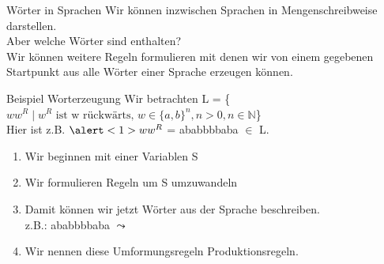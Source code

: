 %
%
%
%

\begin{frame}[fragile]{Wörter in Sprachen}
Wir können inzwischen Sprachen in Mengenschreibweise darstellen.\\Aber welche Wörter sind enthalten?\\
\vspace{0.3cm}
Wir können weitere Regeln formulieren mit denen wir von einem gegebenen Startpunkt aus alle Wörter einer Sprache erzeugen können.
\end{frame}

\begin{frame}[fragile]{Beispiel Worterzeugung}
    \small{Wir betrachten L = \{$ww^R \mid w^R\text{ ist w rückwärts, }w \in \{a, b\}^n, n>0, n\in \mathbb{N}$\}\\
    Hier ist z.B. $\alert<1>{w}w^R$ = \alert<1>{ababb}bbaba $\in$ L.}\\
    \begin{enumerate}
    \item <2-> 
            \alert<2,5>{Wir beginnen mit einer Variablen S}
    \item <3-> 
            \alert<3>{Wir formulieren Regeln um S umzuwandeln}
            \alert<4>{}\vspace{-0.3in}
    \item <5->
            \alert<5>{Damit können wir jetzt Wörter aus der Sprache beschreiben.}\\
            z.B.: \alert<6>{a}\alert<7>{b}\alert<8>{a}\alert<9>{b}\alert<10>{bb}\alert<9>{b}\alert<8>{a}\alert<7>{b}\alert<6>{a} $\leadsto$ 
    \item <11> \alert<11>{Wir nennen diese Umformungsregeln Produktionsregeln.}
    \end{enumerate}
\end{frame}

